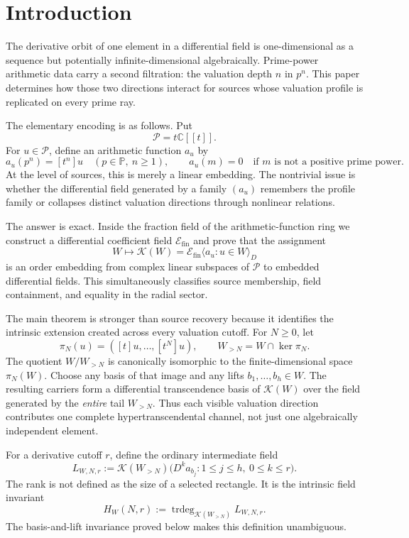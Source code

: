\documentclass[11pt]{article}
\theoremstyle{definition}
\theoremstyle{remark}
\newcommand{\C}{\mathbb C}
\newcommand{\PP}{\mathbb P}
\newcommand{\Efin}{\mathcal E_{\mathrm{fin}}}
\newcommand{\Pcal}{\mathcal P}
\newcommand{\K}{\mathcal K}
\newcommand{\trdeg}{\operatorname{trdeg}}
\begin{document}
\section{Introduction}

The derivative orbit of one element in a differential field is one-dimensional as a sequence but
potentially infinite-dimensional algebraically.  Prime-power arithmetic data carry a second
filtration: the valuation depth $n$ in $p^n$.  This paper determines how those two directions
interact for sources whose valuation profile is replicated on every prime ray.

The elementary encoding is as follows.  Put
\[
  \Pcal=t\C[[t]].
\]
For $u\in\Pcal$, define an arithmetic function $a_u$ by
\begin{equation}\label{eq:radial-source}
 a_u(p^n)=[t^n]u\quad(p\in\PP,\ n\ge1),
 \qquad
 a_u(m)=0\quad\text{if $m$ is not a positive prime power}.
\end{equation}
At the level of sources, this is merely a linear embedding.  The nontrivial issue is whether the
differential field generated by a family $(a_u)$ remembers the profile family or collapses
distinct valuation directions through nonlinear relations.

The answer is exact.  Inside the fraction field of the arithmetic-function ring we construct a
differential coefficient field $\Efin$ and prove that the assignment
\begin{equation}\label{eq:field-functor}
 W\longmapsto \K(W)=\Efin\langle a_u:u\in W\rangle_D
\end{equation}
is an order embedding from complex linear subspaces of $\Pcal$ to embedded differential fields.
This simultaneously classifies source membership, field containment, and equality in the radial
sector.

The main theorem is stronger than source recovery because it identifies the intrinsic extension
created across every valuation cutoff.  For $N\ge0$, let
\[
 \pi_N(u)=([t]u,\ldots,[t^N]u),
 \qquad W_{>N}=W\cap\ker\pi_N.
\]
The quotient $W/W_{>N}$ is canonically isomorphic to the finite-dimensional space $\pi_N(W)$.
Choose any basis of that image and any lifts $b_1,\ldots,b_h\in W$.  The resulting carriers form a
differential transcendence basis of $\K(W)$ over the field generated by the \emph{entire} tail
$W_{>N}$.  Thus each visible valuation direction contributes one complete hypertranscendental
channel, not just one algebraically independent element.

For a derivative cutoff $r$, define the ordinary intermediate field
\begin{equation}\label{eq:finite-jet-field-intro}
 L_{W,N,r}:=\K(W_{>N})
  \bigl(D^ka_{b_j}:1\le j\le h,\ 0\le k\le r\bigr).
\end{equation}
The rank is not defined as the size of a selected rectangle.  It is the intrinsic field invariant
\begin{equation}\label{eq:H-intrinsic-intro}
 H_W(N,r):=\trdeg_{\K(W_{>N})}L_{W,N,r}.
\end{equation}
The basis-and-lift invariance proved below makes this definition unambiguous.
\end{document}
